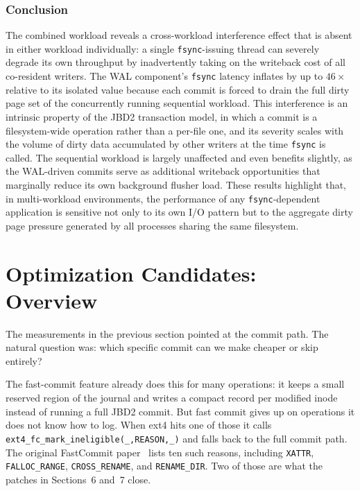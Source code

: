 \documentclass[12pt,a4paper]{article}
\begin{document}
\subsubsection{Conclusion}
The combined workload reveals a cross-workload interference effect that is absent in
either workload individually: a single \texttt{fsync}-issuing thread can severely
degrade its own throughput by inadvertently taking on the writeback cost of all
co-resident writers. The WAL component's \texttt{fsync} latency inflates by up to
$46\times$ relative to its isolated value because each commit is forced to drain the
full dirty page set of the concurrently running sequential workload. This interference
is an intrinsic property of the JBD2 transaction model, in which a commit is a
filesystem-wide operation rather than a per-file one, and its severity scales with the
volume of dirty data accumulated by other writers at the time \texttt{fsync} is called.
The sequential workload is largely unaffected and even benefits slightly, as the
WAL-driven commits serve as additional writeback opportunities that marginally reduce
its own background flusher load. These results highlight that, in multi-workload
environments, the performance of any \texttt{fsync}-dependent application is sensitive
not only to its own I/O pattern but to the aggregate dirty page pressure generated by
all processes sharing the same filesystem.


\section{Optimization Candidates: Overview}

The measurements in the previous section pointed at the commit path. The natural
question was: which specific commit can we make cheaper or skip
entirely?

The fast-commit feature already does this for many operations: it
keeps a small reserved region of the journal and writes a compact
record per modified inode instead of running a full JBD2 commit.
But fast commit gives up on operations it does not know how to log.
When ext4 hits one of those it calls
\texttt{ext4\_fc\_mark\_ineligible(\_,REASON,\_)} and falls back to
the full commit path. The original FastCommit
paper~\cite{atc24-fc} lists ten such reasons, including
\texttt{XATTR}, \texttt{FALLOC\_RANGE}, \texttt{CROSS\_RENAME},
and \texttt{RENAME\_DIR}. Two of those are what the patches in
Sections~6 and~7 close.
\end{document}

